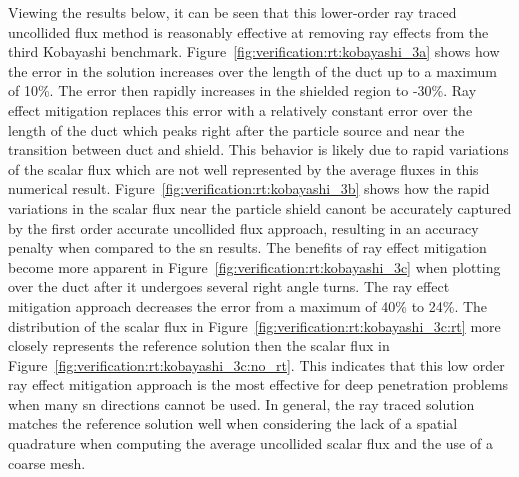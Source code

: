 Viewing the results below, it can be seen that this lower-order ray traced uncollided flux method is reasonably effective at removing ray effects from the third Kobayashi benchmark. Figure~\ref{fig:verification:rt:kobayashi_3a} shows how the error in the solution increases over the length of the duct up to a maximum of 10\%. The error then rapidly increases in the shielded region to -30\%. Ray effect mitigation replaces this error with a relatively constant error over the length of the duct which peaks right after the particle source and near the transition between duct and shield. This behavior is likely due to rapid variations of the scalar flux which are not well represented by the average fluxes in this numerical result. Figure~\ref{fig:verification:rt:kobayashi_3b} shows how the rapid variations in the scalar flux near the particle shield canont be accurately captured by the first order accurate uncollided flux approach, resulting in an accuracy penalty when compared to the \acrshort{sn} results. The benefits of ray effect mitigation become more apparent in Figure~\ref{fig:verification:rt:kobayashi_3c} when plotting over the duct after it undergoes several right angle turns. The ray effect mitigation approach decreases the error from a maximum of 40\% to 24\%. The distribution of the scalar flux in Figure~\ref{fig:verification:rt:kobayashi_3c:rt} more closely represents the reference solution then the scalar flux in Figure~\ref{fig:verification:rt:kobayashi_3c:no_rt}. This indicates that this low order ray effect mitigation approach is the most effective for deep penetration problems when many \acrshort{sn} directions cannot be used. In general, the ray traced solution matches the reference solution well when considering the lack of a spatial quadrature when computing the average uncollided scalar flux and the use of a coarse mesh.

